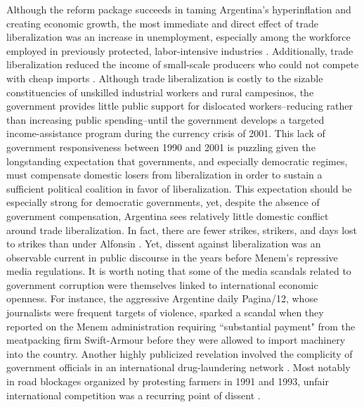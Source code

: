 \documentclass[a4paper]{article}\usepackage[]{graphicx}\usepackage[]{color}
\begin{document}
Although the reform package succeeds in taming Argentina's hyperinflation and creating economic growth, the most immediate and direct effect of trade liberalization was an increase in unemployment, especially among the workforce employed in previously protected, labor-intensive industries \parencite[10]{Beker:2011vq}. Additionally, trade liberalization reduced the income of small-scale producers who could not compete with cheap imports \parencite{eckstein2001power}. Although trade liberalization is costly to the sizable constituencies of unskilled industrial workers and rural campesinos, the government provides little public support for dislocated workers--reducing rather than increasing public spending--until the government develops a targeted income-assistance program during the currency crisis of 2001. This lack of government responsiveness between 1990 and 2001 is puzzling given the longstanding expectation that governments, and especially democratic regimes, must compensate domestic losers from liberalization in order to sustain a sufficient political coalition in favor of liberalization. This expectation should be especially strong for democratic governments, yet, despite the absence of government compensation, Argentina sees relatively little domestic conflict around trade liberalization. In fact, there are fewer strikes, strikers, and days lost to strikes than under Alfonsin \parencite{eckstein2001power}. Yet, dissent against liberalization was an observable current in public discourse in the years before Menem's repressive media regulations. It is worth noting that some of the media scandals related to government corruption were themselves linked to international economic openness. For instance, the aggressive Argentine daily Pagina/12, whose journalists were frequent targets of violence, sparked a scandal when they reported on the Menem administration requiring ``substantial payment" from the meatpacking firm Swift-Armour before they were allowed to import machinery into the country. Another highly publicized revelation involved the complicity of government officials in an international drug-laundering network \parencite{Waisbord:1994kq}. Most notably in road blockages organized by protesting farmers in 1991 and 1993, unfair international competition was a recurring point of dissent \parencites{McCullough:1991cs}{Ferber:1993fb}.
\end{document}
